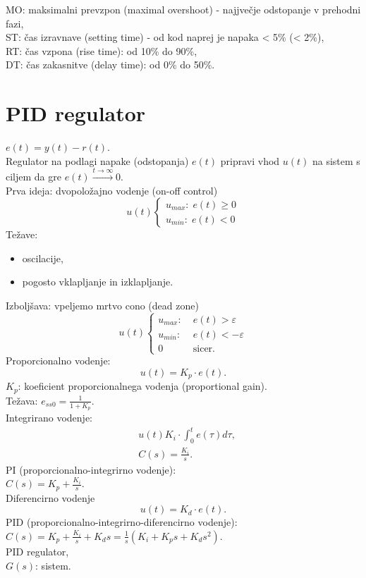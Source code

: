 \documentclass[a4paper, 12pt]{book}
\theoremstyle{definition}
\theoremstyle{remark}
\begin{document}
MO: maksimalni prevzpon (maximal overshoot) - najjvečje odstopanje v prehodni fazi, \\
ST: čas izravnave (setting time) - od kod naprej je napaka < 5\% (< 2\%), \\
RT: čas vzpona (rise time): od 10\% do 90\%, \\
DT: čas zakasnitve (delay time): od 0\% do 50\%.


\section{PID regulator}

$e(t) = y(t) - r(t)$. \\
Regulator na podlagi napake (odstopanja) $e(t)$ pripravi vhod $u(t)$ na sistem
s ciljem da gre $e(t) \stackrel{t \to \infty}{\longrightarrow} 0$. \\
Prva ideja: dvopoložajno vodenje (on-off control)
\begin{equation*}
    u(t) \begin{cases}
        u_{max}: \; e(t) \geq 0 \\
        u_{min}: \; e(t) < 0
    \end{cases}
\end{equation*}
Težave:
\begin{itemize}
    \item oscilacije,
    \item pogosto vklapljanje in izklapljanje.
\end{itemize}
Izboljšava: vpeljemo mrtvo cono (dead zone)
\begin{equation*}
    u(t) \begin{cases}
        u_{max}: \; &e(t) > \varepsilon \\
        u_{min}: \; &e(t) < -\varepsilon \\
        0 &\text{sicer}.
    \end{cases}
\end{equation*}
Proporcionalno vodenje:
\begin{equation*}
    u(t) = K_p \cdot e(t).
\end{equation*}
$K_p$: koeficient proporcionalnega vodenja (proportional gain). \\
Težava: $e_{ss0} = \frac{1}{1+K_p}$. \\
Integrirano vodenje:
\begin{align*}
    &u(t) K_i \cdot \int_0^t e(\tau) d\tau, \\
    &C(s) = \frac{K_i}{s}.
\end{align*}
PI (proporcionalno-integrirno vodenje): \\
$C(s) = K_p + \frac{K_i}{s}$. \\
Diferencirno vodenje \\
\begin{equation*}
    u(t) = K_d \cdot e(t).
\end{equation*}
PID (proporcionalno-integrirno-diferencirno vodenje): \\
$C(s) = K_p + \frac{K_i}{s} + K_d s =
\frac{1}{s} \left( K_i + K_p s + K_d s^2\right)$. \\
PID regulator, \\
$G(s)$: sistem.
\end{document}
